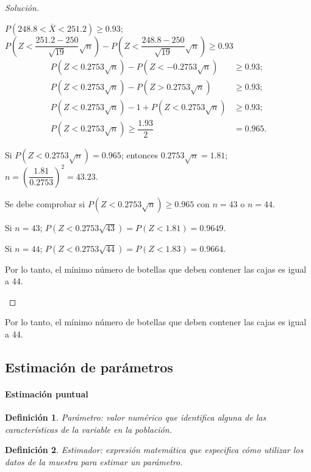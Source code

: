 \documentclass[a5paper,doc,10pt,noapacite]{apa6}
\newtheorem{definicion}{Definición}
\begin{document}
{{\begin{proof}[Solución]
\begin{APAenumerate}
		\vspace{1\baselineskip}
		\item \(P(248.8<\bar{X}<251.2)\geq 0.93\); \(P\left(Z<\dfrac{251.2-250}{\sqrt{19}}\sqrt{n}\right)-P\left(Z<\dfrac{248.8-250}{\sqrt{19}}\sqrt{n}\right)\geq0.93\)
		\begin{align*}
			P(Z<0.2753\sqrt{n})-P(Z<-0.2753\sqrt{n})	&\geq0.93	;
			\\
			P(Z<0.2753\sqrt{n})-P(Z>0.2753\sqrt{n})	&\geq0.93;
			\\
			P(Z<0.2753\sqrt{n})-1+P(Z<0.2753\sqrt{n}) &\geq0.93;
			\\
			P(Z<0.2753\sqrt{n})\geq\dfrac{1.93}{2} &=0.965.
		\end{align*}
		
		Si \(P(Z<0.2753\sqrt{n})=0.965\); entonces \(0.2753\sqrt{n}=1.81\); \(n=\left(\dfrac{1.81}{0.2753}\right)^2=43.23\).
		
		Se debe comprobar si \(P(Z<0.2753\sqrt{n})\geq 0.965\) con \(n=43\)  o \(n=44\).
		
		Si \(n=43\); \(P(Z<0.2753\sqrt{43})=P(Z<1.81)=0.9649\).
		
		Si \(n=44\); \(P(Z<0.2753\sqrt{44})=P(Z<1.83)=0.9664\).
		
		Por lo tanto, el mínimo número de botellas que deben contener las cajas es igual a 44.	\qedhere
	\end{APAenumerate}
\end{proof}

Por lo tanto, el mínimo número de botellas que deben contener las cajas es igual a 44.


\newpage

%
\subsection{Estimación de parámetros}

\paragraph{Estimación puntual}

	
\begin{definicion}
	Parámetro: valor numérico que identifica alguna de las características de la variable en la población.
\end{definicion}
	
\begin{definicion}
	Estimador: expresión matemática que especifica cómo utilizar los datos de la muestra para estimar un parámetro.
\end{definicion}
	
}}
\end{document}
